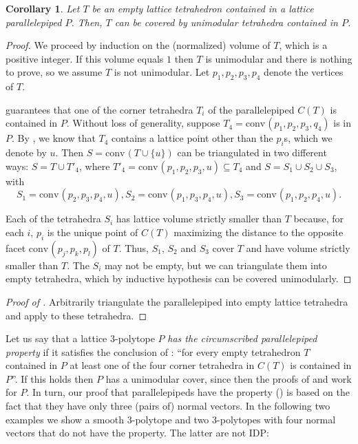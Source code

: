 \documentclass{amsart}
\theoremstyle{plain}
\newtheorem{corollary}[theorem]{Corollary}
\theoremstyle{definition}
\newcommand{\conv}{\ensuremath{\mathrm{conv}}\hspace{1pt}}
\begin{document}
\begin{corollary}
\label{coro:coverpara}
Let $T$ be an empty lattice tetrahedron contained in a lattice parallelepiped $P$. Then, $T$ can be covered by unimodular tetrahedra contained in $P$.
\end{corollary}
\begin{proof}
We proceed by induction on the (normalized) volume of $T$, which is a positive integer. If this volume equals $1$ then $T$ is unimodular and there is nothing to prove, so we assume $T$ is not unimodular. Let $p_1, p_2, p_3, p_4$ denote the vertices of $T$.

 guarantees that one of the corner tetrahedra $T_i$ of the parallelepiped $C(T)$ is contained in $P$. Without loss of generality, suppose $T_4 = \conv(p_1, p_2, p_3,q_4)$ is in $P$. By , we know that $T_4$ contains a lattice point other than the $p_i$s, which we denote by $u$. 
%
Then $S=\conv(T\cup \{u\})$ can be triangulated in two different ways: $S=T \cup T'_4$, where $T'_4 = \conv(p_1, p_2, p_3, u) \subseteq T_4$ and $S= S_1 \cup S_2 \cup S_3$, with
\[
S_1= \conv(p_2,p_3,p_4, u),
S_2=\conv(p_1,p_3,p_4, u),
S_3=\conv(p_1,p_2,p_4, u).
\]

Each of the tetrahedra $S_i$ has lattice volume strictly smaller than $T$ because, for each $i$, $p_i$ is the unique point of $C(T)$ maximizing the distance to the opposite facet $\conv(p_j,p_k,p_l)$ of $T$. Thus, $S_1$, $S_2$ and $S_3$ cover $T$ and have volume strictly smaller than $T$. The $S_i$ may not be empty, but we can triangulate them into empty tetrahedra, which by inductive hypothesis can be covered unimodularly.
\end{proof}

\begin{proof}[Proof of ]
Arbitrarily triangulate the parallelepiped into empty lattice tetrahedra and apply  to these tetrahedra.
\end{proof}


Let us say that a lattice $3$-polytope $P$ \emph{has the circumscribed parallelepiped property} if it satisfies the conclusion of :  ``for every empty tetrahedron $T$ contained in $P$ at least one of the four corner tetrahedra in $C(T)$ is 
contained in $P$''. 
If this holds then $P$ has a unimodular cover, since then the proofs of  and  work for $P$.
In turn, our proof that parallelepipeds have the property () is based on the fact that they have only three (pairs of) normal vectors. 
In the following two examples we show a smooth $3$-polytope and two $3$-polytopes with four normal vectors that do not have the property. The latter are not IDP:
\end{document}
